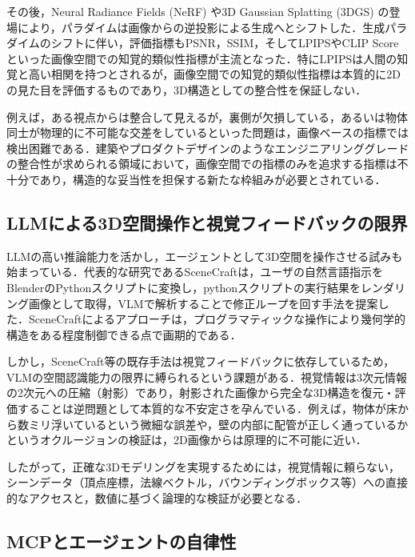 \documentclass[dvipdfmx, a4paper, 9pt]{deimj}
\begin{document}
その後，Neural Radiance Fields (NeRF)\cite{mildenhall2020nerf} や3D Gaussian Splatting (3DGS)\cite{kerbl20233dgs} の登場により，パラダイムは画像からの逆投影による生成へとシフトした．生成パラダイムのシフトに伴い，評価指標もPSNR，SSIM，そしてLPIPS\cite{zhang2018lpips}やCLIP Score\cite{radford2021clip}といった画像空間での知覚的類似性指標が主流となった．特にLPIPSは人間の知覚と高い相関を持つとされるが，画像空間での知覚的類似性指標は本質的に2Dの見た目を評価するものであり，3D構造としての整合性を保証しない．

例えば，ある視点からは整合して見えるが，裏側が欠損している，あるいは物体同士が物理的に不可能な交差をしているといった問題は，画像ベースの指標では検出困難である\cite{poole2022dreamfusion}．建築やプロダクトデザインのようなエンジニアリンググレードの整合性が求められる領域において，画像空間での指標のみを追求する指標は不十分であり，構造的な妥当性を担保する新たな枠組みが必要とされている．

\subsection{LLMによる3D空間操作と視覚フィードバックの限界}

LLMの高い推論能力を活かし，エージェントとして3D空間を操作させる試みも始まっている．代表的な研究であるSceneCraft\cite{hu2024scenecraft}は，ユーザの自然言語指示をBlenderのPythonスクリプトに変換し，pythonスクリプトの実行結果をレンダリング画像として取得，VLMで解析することで修正ループを回す手法を提案した．SceneCraftによるアプローチは，プログラマティックな操作により幾何学的構造をある程度制御できる点で画期的である．

しかし，SceneCraft等の既存手法は視覚フィードバックに依存しているため，VLMの空間認識能力の限界に縛られるという課題がある．視覚情報は3次元情報の2次元への圧縮（射影）であり，射影された画像から完全な3D構造を復元・評価することは逆問題として本質的な不安定さを孕んでいる．例えば，物体が床から数ミリ浮いているという微細な誤差や，壁の内部に配管が正しく通っているかというオクルージョンの検証は，2D画像からは原理的に不可能に近い．

したがって，正確な3Dモデリングを実現するためには，視覚情報に頼らない，シーンデータ（頂点座標，法線ベクトル，バウンディングボックス等）への直接的なアクセスと，数値に基づく論理的な検証が必要となる．

\subsection{MCPとエージェントの自律性}
\end{document}
